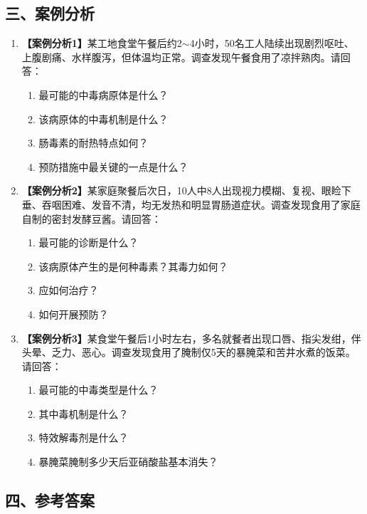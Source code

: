 {\subsection*{三、案例分析}

\begin{enumerate}[leftmargin=*]
    \item \textbf{【案例分析1】}某工地食堂午餐后约2$\sim$4小时，50名工人陆续出现剧烈呕吐、上腹剧痛、水样腹泻，但体温均正常。调查发现午餐食用了凉拌熟肉。请回答：
    \begin{enumerate}[leftmargin=*]
        \item 最可能的中毒病原体是什么？
        \item 该病原体的中毒机制是什么？
        \item 肠毒素的耐热特点如何？
        \item 预防措施中最关键的一点是什么？
    \end{enumerate}

    \item \textbf{【案例分析2】}某家庭聚餐后次日，10人中8人出现视力模糊、复视、眼睑下垂、吞咽困难、发音不清，均无发热和明显胃肠道症状。调查发现食用了家庭自制的密封发酵豆酱。请回答：
    \begin{enumerate}[leftmargin=*]
        \item 最可能的诊断是什么？
        \item 该病原体产生的是何种毒素？其毒力如何？
        \item 应如何治疗？
        \item 如何开展预防？
    \end{enumerate}

    \item \textbf{【案例分析3】}某食堂午餐后1小时左右，多名就餐者出现口唇、指尖发绀，伴头晕、乏力、恶心。调查发现食用了腌制仅5天的暴腌菜和苦井水煮的饭菜。请回答：
    \begin{enumerate}[leftmargin=*]
        \item 最可能的中毒类型是什么？
        \item 其中毒机制是什么？
        \item 特效解毒剂是什么？
        \item 暴腌菜腌制多少天后亚硝酸盐基本消失？
    \end{enumerate}
\end{enumerate}

\subsection*{四、参考答案}

}
